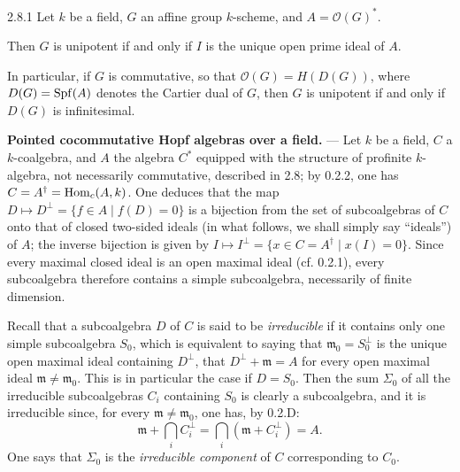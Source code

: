 \begin{proposition}{2.8.1}\label{VIIB.2.8.1}
Let $k$ be a field, $G$ an affine group $k$-scheme, and $A=\mathcal O(G)^*$.
\begin{enumeratei}
\item Then $G$ is unipotent if and only if $I$ is the unique open prime ideal of $A$.
\item In particular, if $G$ is commutative, so that $\mathcal O(G)=H(D(G))$, where $D(G)=\operatorname{Spf}(A)$ denotes the Cartier dual of $G$, then $G$ is unipotent if and only if $D(G)$ is infinitesimal.
\end{enumeratei}
\end{proposition}

\textbf{Pointed cocommutative Hopf algebras over a field.} --- Let $k$ be a field, $C$ a $k$-coalgebra, and $A$ the algebra $C^*$ equipped with the structure of profinite $k$-algebra, not necessarily commutative, described in 2.8; by 0.2.2, one has $C=A^\dagger=\operatorname{Hom}_c(A,k)$. One deduces that the map $D\mapsto D^\perp=\{f\in A\mid f(D)=0\}$ is a bijection from the set of subcoalgebras of $C$ onto that of closed two-sided ideals (in what follows, we shall simply say ``ideals'') of $A$; the inverse bijection is given by $I\mapsto I^\perp=\{x\in C=A^\dagger\mid x(I)=0\}$. Since every maximal closed ideal is an open maximal ideal (cf. 0.2.1), every subcoalgebra therefore contains a simple subcoalgebra, necessarily of finite dimension.

Recall that a subcoalgebra $D$ of $C$ is said to be \emph{irreducible} if it contains only one simple subcoalgebra $S_0$, which is equivalent to saying that $\mathfrak m_0=S_0^\perp$ is the unique open maximal ideal containing $D^\perp$, \ie that $D^\perp+\mathfrak m=A$ for every open maximal ideal $\mathfrak m\ne\mathfrak m_0$. This is in particular the case if $D=S_0$. Then the sum $\Sigma_0$ of all the irreducible subcoalgebras $C_i$ containing $S_0$ is clearly a subcoalgebra, and it is irreducible since, for every $\mathfrak m\ne\mathfrak m_0$, one has, by 0.2.D:
\[
\mathfrak m+\bigcap_i C_i^\perp=\bigcap_i(\mathfrak m+C_i^\perp)=A.
\]
One says that $\Sigma_0$ is the \emph{irreducible component} of $C$ corresponding to $C_0$.

